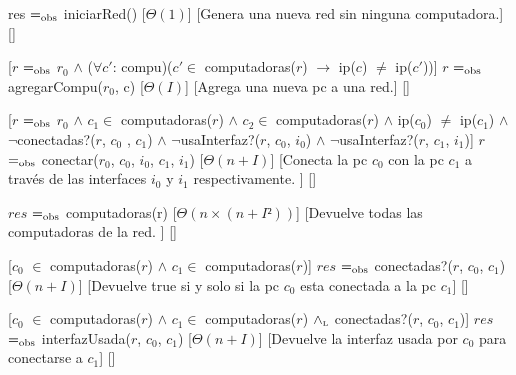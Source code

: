 \begin{Interfaz}
  

  

  {res $=_{\mathrm{obs}}$ iniciarRed()}%
  [$\Theta(1)$]%
  [Genera una nueva red sin ninguna computadora.]%
  []%
  
  [$r$ $=_{\mathrm{obs}}$ $r_{0}$ $\land$ ($\forall c'$: compu)($c' \in$ computadoras($r$) $\rightarrow$ ip($c$) $\neq$ ip($c'$))]%
  {$r$ $=_{\mathrm{obs}}$ agregarCompu($r_{0}$, c)}%
  [$\Theta(I)$]%
  [Agrega una nueva pc a una red.]%
  []%

  [$r$ $=_{\mathrm{obs}}$ $r_{0}$ $\land$ $c_{1} \in$ computadoras($r$) $\land$ $c_{2} \in$ computadoras($r$) $\land$ ip($c_{0} $) $\neq$ ip($c_{1}$) $\land$ $\lnot$conectadas?($r$, $c_{0}$ , $c_{1} $) $\land$ $\lnot$usaInterfaz?($r$, $c_{0}$, $i_{0}$) $\land$ $\lnot$usaInterfaz?($r$, $c_{1}$, $i_{1}$)]%
  {$r$ $=_{\mathrm{obs}}$ conectar($r_{0}$, $c_{0}$, $i_{0}$, $c_{1}$, $i_{1}$)}%
  [$\Theta(n+I)$]%
  [Conecta la pc $c_{0}$ con la pc $c_{1}$ a trav\'es de las interfaces $i_{0}$ y $i_{1}$ respectivamente. ]%
  []%
  
  {$res$ $=_{\mathrm{obs}}$ computadoras(r)} %
  [$\Theta(n \times (n+I²))$]%
  [Devuelve todas las computadoras de la red. ]%
  []%
  
  [$c_{0}$ $\in$ computadoras($r$) $\land$ $c_{1} \in $ computadoras($r$)]%
  {$res$ $=_{\mathrm{obs}}$ conectadas?($r$, $c_{0}$, $c_{1}$)}%
  [$\Theta(n+I)$]%
  [Devuelve true si y solo si la pc $c_{0}$ esta conectada a la pc $c_{1}$]%
  []%
  
  [$c_{0}$ $\in$ computadoras($r$) $\land$ $c_{1} \in $ computadoras($r$) $\land_{\mathrm{\scriptscriptstyle{L}}}$ conectadas?($r$, $c_{0}$, $c_{1}$)]%
  {$res$ $=_{\mathrm{obs}}$ interfazUsada($r$, $c_{0}$, $c_{1}$)}%
  [$\Theta(n+I)$]%
  [Devuelve la interfaz usada por $c_{0}$ para conectarse a $c_{1}$]%
  []%
  

\end{Interfaz}
